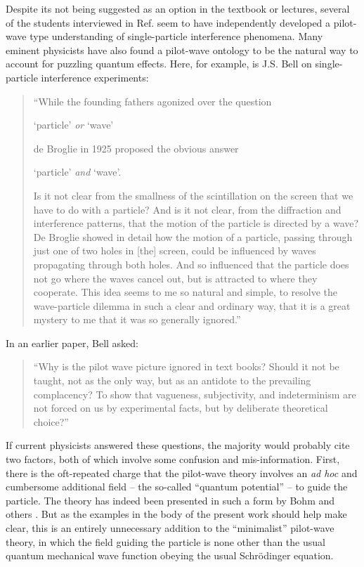 \documentclass[aps,prc,onecolumn,letterpaper,floatfix,12pt]{revtex4}
\begin{document}
Despite its not being suggested as an option in the textbook or
lectures, several of the students interviewed in
Ref.  seem to have independently developed a
pilot-wave type understanding of single-particle interference
phenomena.  Many eminent physicists have also found a pilot-wave
ontology to be the natural way to account for puzzling quantum
effects.  Here, for example, is J.S. Bell on 
single-particle interference experiments:
\begin{quote}
``While the founding fathers agonized over the question 
\begin{center}
`particle' \emph{or} `wave' 
\end{center}
de Broglie in 1925 proposed the obvious answer
\begin{center}
`particle' \emph{and} `wave'.
\end{center}
Is it not clear from the smallness of the scintillation on the screen
that we have to do with a particle?  And is it not clear, from the
diffraction and interference patterns, that the motion of the particle
is directed by a wave?  De Broglie showed in detail how the motion of
a particle, passing through just one of two holes in [the] screen,
could be influenced by waves propagating through both holes.  And so
influenced that the particle does not go where the waves cancel out,
but is attracted to where they cooperate.  This idea seems to me so
natural and simple, to resolve the wave-particle dilemma in such a
clear and ordinary way, that it is a great mystery to me that it was
so generally ignored.'' \cite{bell6}
\end{quote}
In an earlier paper, Bell asked:
\begin{quote}
``Why is the pilot
wave picture ignored in text books? Should it not be taught, not as
the only way, but as an antidote to the prevailing complacency? To 
show that vagueness, subjectivity, and indeterminism are not forced 
on us by experimental facts, but by deliberate theoretical 
choice?'' \cite{bellwhy}
\end{quote}
If current physicists answered these questions, the majority would probably
cite two factors, both of which involve some confusion and
mis-information.  First, there is the oft-repeated charge that the
pilot-wave theory involves an \emph{ad hoc} and cumbersome additional
field -- the so-called ``quantum potential'' -- to guide the
particle.  The theory has indeed been presented in such a form by Bohm
and others \cite{uu,holland}.  But as the examples in the body of the
present work should help make clear, this is an entirely unnecessary
addition to the ``minimalist'' pilot-wave theory, in which the field
guiding the particle is none other than the usual quantum mechanical
wave function obeying the usual Schr\"odinger equation.  
\end{document}
